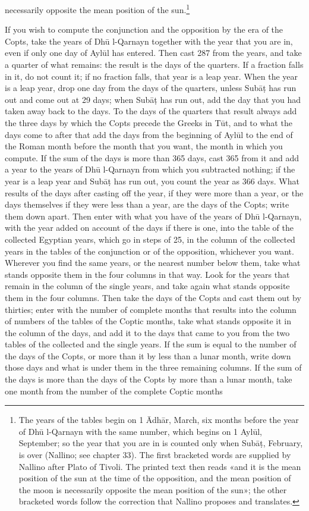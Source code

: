 \documentclass[11pt]{article}
\newcommand{\ArPage}[1]{\marginpar{\footnotesize\color{gray}Ar.\,p.\,#1}}
\begin{document}
necessarily opposite the mean position of the sun.\footnote{The years of the tables begin on 1 Ādhār, March, six months before the year of Dhū l-Qarnayn with the same number, which begins on 1 Aylūl, September; so the year that you are in is counted only when Subāṭ, February, is over (Nallino; see chapter 33). The first bracketed words are supplied by Nallino after Plato of Tivoli. The printed text then reads «and it is the mean position of the sun at the time of the opposition, and the mean position of the moon is necessarily opposite the mean position of the sun»; the other bracketed words follow the correction that Nallino proposes and translates.}\par
\par \ArPage{140}If you wish to compute the conjunction and the opposition by the era of the Copts, take the years of Dhū l-Qarnayn together with the year that you are in, even if only one day of Aylūl has entered. Then cast 287 from the years, and take a quarter of what remains: the result is the days of the quarters. If a fraction falls in it, do not count it; if no fraction falls, that year is a leap year. When the year is a leap year, drop one day from the days of the quarters, unless Subāṭ has run out and come out at 29 days; when Subāṭ has run out, add the day that you had taken away back to the days. To the days of the quarters that result always add the three days by which the Copts precede the Greeks in Tūt, and to what the days come to after that add the days from the beginning of Aylūl to the end of the Roman month before the month that you want, the month in which you compute. If the sum of the days is more than 365 days, cast 365 from it and add a year to the years of Dhū l-Qarnayn from which you subtracted nothing; if the year is a leap year and Subāṭ has run out, you count the year as 366 days. What results of the days after casting off the year, if they were more than a year, or the days themselves if they were less than a year, are the days of the Copts; write them down apart. Then enter with what you have of the years of Dhū l-Qarnayn, with the year added on account of the days if there is one, into the table of the collected Egyptian years, which go in steps of 25, in the column of the collected years in the tables of the conjunction or of the opposition, whichever you want. Wherever you find the same years, or the nearest number below them, take what stands opposite them in the four columns in that way. Look for the years that remain in the column of the single years, and take again what stands opposite them in the four columns. Then take the days of the Copts and cast them out by thirties; enter with the number of complete months that results into the column of numbers of the tables of the Coptic months, take what stands opposite it in the column of the days, and add it to the days that came to you from the two tables of the collected and the single years. If the sum is equal to the number of the days of the Copts, or more than it by less than a lunar month, write down those days and what is under them in the three remaining columns. If the sum of the days is more than the days of the Copts by more than a lunar month, take one month from the number of the complete Coptic months 
\end{document}
